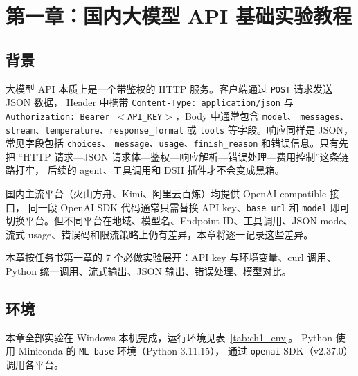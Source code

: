 \clearpage
\section{第一章：国内大模型 API 基础实验教程}

\subsection{背景}

大模型 API 本质上是一个带鉴权的 HTTP 服务。客户端通过 \texttt{POST} 请求发送 JSON 数据，
Header 中携带 \texttt{Content-Type: application/json} 与
\texttt{Authorization: Bearer $<$API\_KEY$>$}，Body 中通常包含 \texttt{model}、
\texttt{messages}、\texttt{stream}、\texttt{temperature}、\texttt{response\_format} 或
\texttt{tools} 等字段。响应同样是 JSON，常见字段包括 \texttt{choices}、
\texttt{message}、\texttt{usage}、\texttt{finish\_reason} 和错误信息。只有先把
``HTTP 请求—JSON 请求体—鉴权—响应解析—错误处理—费用控制''这条链路打牢，
后续的 agent、工具调用和 DSH 插件才不会变成黑箱。

国内主流平台（火山方舟、Kimi、阿里云百炼）均提供 OpenAI-compatible 接口，
同一段 OpenAI SDK 代码通常只需替换 API key、\texttt{base\_url} 和 \texttt{model}
即可切换平台。但不同平台在地域、模型名、Endpoint ID、工具调用、JSON mode、
流式 usage、错误码和限流策略上仍有差异，本章将逐一记录这些差异。

本章按任务书第一章的 7 个必做实验展开：API key 与环境变量、curl 调用、
Python 统一调用、流式输出、JSON 输出、错误处理、模型对比。

\subsection{环境}

本章全部实验在 Windows 本机完成，运行环境见表~\ref{tab:ch1_env}。
Python 使用 Miniconda 的 \texttt{ML-base} 环境（Python 3.11.15），
通过 \texttt{openai} SDK（v2.37.0）调用各平台。

